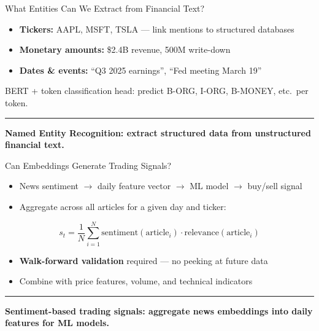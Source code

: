 \documentclass[8pt,aspectratio=169]{beamer}
\newcommand{\bottomnote}[1]{%
\vfill
\vspace{-2mm}
\textcolor{mllavender2}{\rule{\textwidth}{0.4pt}}
\vspace{1mm}
\footnotesize
\textbf{#1}
}
\newenvironment{compactlist}{%
  \begin{itemize}%
    \setlength{\itemsep}{2pt}%
    \setlength{\parskip}{0pt}%
    \setlength{\parsep}{0pt}%
}{%
  \end{itemize}%
}
\newcommand{\highlight}[1]{\textcolor{mlorange}{\textbf{#1}}}
\begin{document}
\begin{frame}{What Entities Can We Extract from Financial Text?}
\begin{compactlist}
\item \textbf{Tickers:} AAPL, MSFT, TSLA --- link mentions to structured databases
\item \textbf{Monetary amounts:} \$2.4B revenue, \EUR{}500M write-down
\item \textbf{Dates \& events:} ``Q3 2025 earnings'', ``Fed meeting March 19''
\end{compactlist}

\vspace{3mm}
\begin{center}
\end{center}

\vspace{2mm}
BERT + token classification head: predict B-ORG, I-ORG, B-MONEY, etc.\ per token.
\bottomnote{Named Entity Recognition: extract structured data from unstructured financial text.}
\end{frame}

\begin{frame}{Can Embeddings Generate Trading Signals?}
\begin{compactlist}
\item News sentiment $\to$ daily feature vector $\to$ ML model $\to$ buy/sell signal
\item Aggregate across all articles for a given day and ticker:
\end{compactlist}

\vspace{2mm}
\[
s_t = \frac{1}{N}\sum_{i=1}^{N}\text{sentiment}(\text{article}_i) \cdot \text{relevance}(\text{article}_i)
\]

\vspace{2mm}
\begin{compactlist}
\item \highlight{Walk-forward validation} required --- no peeking at future data
\item Combine with price features, volume, and technical indicators
\end{compactlist}
\bottomnote{Sentiment-based trading signals: aggregate news embeddings into daily features for ML models.}
\end{frame}
\end{document}
